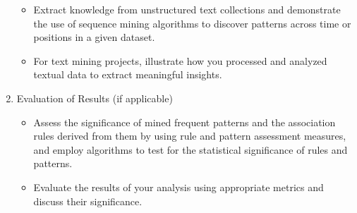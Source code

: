 \begin{enumerate}
  \begin{itemize}
    \item Extract knowledge from unstructured text collections and demonstrate the use of sequence mining algorithms to discover patterns across time or positions in a given dataset.
    \item For text mining projects, illustrate how you processed and analyzed textual data to extract meaningful insights.
  \end{itemize}
  \item Evaluation of Results (if applicable)
  \begin{itemize}
    \item Assess the significance of mined frequent patterns and the association rules derived from them by using rule and pattern assessment measures, and employ algorithms to test for the statistical significance of rules and patterns.
    \item Evaluate the results of your analysis using appropriate metrics and discuss their significance.
  \end{itemize}
\end{enumerate}